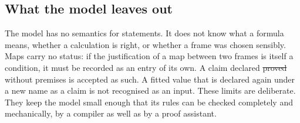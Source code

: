 \subsection{What the model leaves out}

The model has no semantics for statements. It does not know what a formula means, whether a calculation is right, or whether a frame
was chosen sensibly. Maps carry no status: if the justification of a map between two frames is itself a condition, it must be recorded
as an entry of its own. A claim declared \st{proved} without premises is accepted as such. A fitted value that is declared again under
a new name as a claim is not recognised as an input. These limits are deliberate. They keep the model small enough that its rules can
be checked completely and mechanically, by a compiler as well as by a proof assistant.
